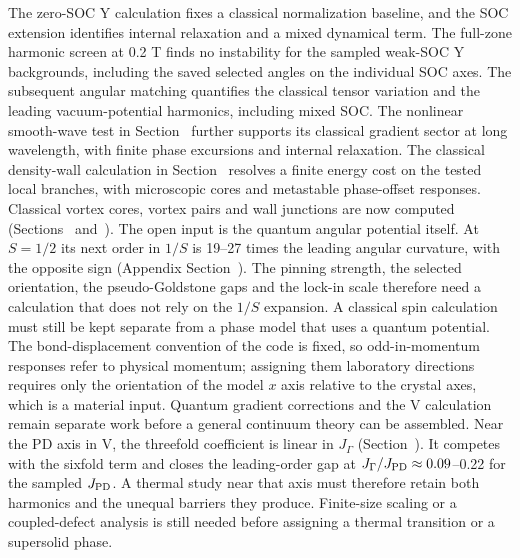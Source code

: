 The zero-SOC Y calculation fixes a classical normalization baseline, and
the SOC extension identifies internal relaxation and a mixed dynamical
term. The full-zone harmonic screen at 0.2 T finds no instability for
the sampled weak-SOC Y backgrounds, including the saved selected angles
on the individual SOC axes. The subsequent angular matching quantifies
the classical tensor variation and the leading vacuum-potential
harmonics, including mixed SOC. The nonlinear smooth-wave test in
Section~ further supports its
classical gradient sector at long wavelength, with finite phase
excursions and internal relaxation. The classical density-wall
calculation in Section~ resolves a finite
energy cost on the tested local branches, with microscopic cores and
metastable phase-offset responses. Classical vortex cores, vortex pairs
and wall junctions are now computed
(Sections~
and~). The open input is the quantum
angular potential itself. At \(S=1/2\) its next order in \(1/S\) is
19--27 times the leading angular curvature, with the opposite sign
(Appendix Section~). The pinning strength,
the selected orientation, the pseudo-Goldstone gaps and the lock-in
scale therefore need a calculation that does not rely on the \(1/S\)
expansion. A classical spin calculation must still be kept separate
from a phase model that uses a quantum potential. The bond-displacement convention of the code is fixed, so
odd-in-momentum responses refer to physical momentum; assigning them
laboratory directions requires only the orientation of the model \(x\)
axis relative to the crystal axes, which is a material input.
Quantum gradient corrections and the V calculation remain separate work
before a general continuum theory can be assembled. Near the PD axis in
V, the threefold coefficient is linear in \(J_\Gamma\)
(Section~). It competes with the sixfold term
and closes the leading-order gap at \(J_\Gamma/J_{\rm PD}\approx0.09\)--0.22
for the sampled \(J_{\rm PD}\). A thermal study near that axis must
therefore retain both harmonics and the unequal barriers they produce.
Finite-size scaling or a coupled-defect analysis is still needed before
assigning a thermal transition or a supersolid phase.

